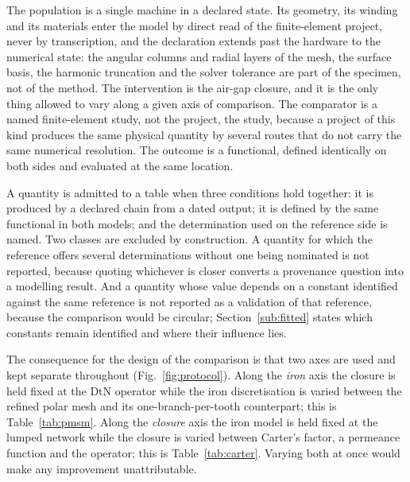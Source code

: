 \documentclass[10pt,a4paper,twocolumn]{article}
\theoremstyle{plain}
\theoremstyle{remark}
\begin{document}
The population is a single machine in a declared state. Its geometry,
its winding and its materials enter the model by direct read of the
finite-element project, never by transcription, and the declaration
extends past the hardware to the numerical state: the angular columns and radial layers of the
mesh, the surface basis, the harmonic truncation and the solver
tolerance are part of the specimen, not of the method. The intervention
is the air-gap closure, and it is the only thing allowed to vary along a
given axis of comparison. The comparator is a named finite-element
study, not the project, the study, because a project of this kind
produces the same physical quantity by several routes that do not carry
the same numerical resolution. The outcome is a functional, defined
identically on both sides and evaluated at the same location.

A quantity is admitted to a table when three conditions hold together:
it is produced by a declared chain from a dated output; it is defined by
the same functional in both models; and the determination used on the
reference side is named. Two classes are excluded by construction. A
quantity for which the reference offers several determinations without
one being nominated is not reported, because quoting whichever is closer
converts a provenance question into a modelling result. And a quantity
whose value depends on a constant identified against the same reference
is not reported as a validation of that reference, because the
comparison would be circular; Section~\ref{sub:fitted} states which
constants remain identified and where their influence lies.

The consequence for the design of the comparison is that two axes are
used and kept separate throughout (Fig.~\ref{fig:protocol}). Along the
\emph{iron} axis the closure is held fixed at the DtN operator while the
iron discretisation is varied between the refined polar mesh and its
one-branch-per-tooth counterpart; this is Table~\ref{tab:pmsm}. Along
the \emph{closure} axis the iron model is held fixed at the lumped
network while the closure is varied between Carter's factor, a permeance
function and the operator; this is Table~\ref{tab:carter}. Varying both
at once would make any improvement unattributable.
\end{document}
